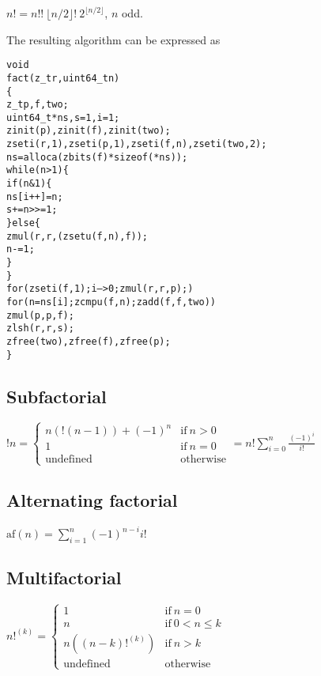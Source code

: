 \vspace{1em}
\( \displaystyle{
    n! = n!! ~ \lfloor n / 2 \rfloor! ~ 2^{\lfloor n / 2 \rfloor}
}\), $n$ odd.
\vspace{1em}

\noindent
The resulting algorithm can be expressed as

\begin{alltt}
   void
   fact(z_t r, uint64_t n)
   \{
       z_t p, f, two;
       uint64_t *ns, s = 1, i = 1;
       zinit(p), zinit(f), zinit(two);
       zseti(r, 1), zseti(p, 1), zseti(f, n), zseti(two, 2);
       ns = alloca(zbits(f) * sizeof(*ns));
       while (n > 1) \{
           if (n & 1) \{
               ns[i++] = n;
               s += n >>= 1;
           \} else \{
               zmul(r, r, (zsetu(f, n), f));
               n -= 1;
           \}
       \}
       for (zseti(f, 1); i-- > 0; zmul(r, r, p);)
           for (n = ns[i]; zcmpu(f, n); zadd(f, f, two))
               zmul(p, p, f);
       zlsh(r, r, s);
       zfree(two), zfree(f), zfree(p);
   \}
\end{alltt}


\subsection{Subfactorial}
\label{sec:Subfactorial}

\( \displaystyle{
    !n = \left \lbrace \begin{array}{ll}
      n(!(n - 1)) + (-1)^n & \textrm{if}~ n > 0 \\
      1 & \textrm{if}~ n = 0 \\
      \textrm{undefined} & \textrm{otherwise}
    \end{array} \right . =
    n! \sum_{i = 0}^n \frac{(-1)^i}{i!}
}\)


\subsection{Alternating factorial}
\label{sec:Alternating factorial}

\( \displaystyle{
    \mbox{af}(n) = \sum_{i = 1}^n {(-1)^{n - i} i!}
}\)


\subsection{Multifactorial}
\label{sec:Multifactorial}

\( \displaystyle{
    n!^{(k)} = \left \lbrace \begin{array}{ll}
      1 & \textrm{if}~ n = 0 \\
      n & \textrm{if}~ 0 < n \le k \\
      n((n - k)!^{(k)}) & \textrm{if}~ n > k \\
      \textrm{undefined} & \textrm{otherwise}
    \end{array} \right .
}\)


